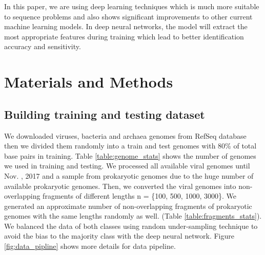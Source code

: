 \documentclass[conference]{IEEEtran}
\begin{document}

In this paper, we are using deep learning techniques which is much more suitable to sequence problems and also shows significant improvements to other current machine learning models. In deep neural networks, the model will extract the most appropriate features during training which lead to better identification accuracy and sensitivity. 

\section{Materials and Methods}

\subsection{Building training and testing dataset}
We downloaded viruses, bacteria and archaea genomes from RefSeq database then we divided them randomly into a train and test genomes with 80\% of total base pairs in training. Table \ref{table:genome_stats} shows the number of genomes we used in training and testing. We processed all available viral genomes until Nov. , 2017 and a sample from prokaryotic genomes due to the huge number of available prokaryotic genomes. Then, we converted the viral genomes into non-overlapping fragments of different lengths n = \{100, 500, 1000, 3000\}. We generated an approximate number of non-overlapping fragments of prokaryotic genomes with the same lengths randomly as well. (Table \ref{table:fragments_stats}). We balanced the data of both classes using random under-sampling technique to avoid the bias to the majority class with the deep neural network. Figure \ref{fig:data_pipline} shows more details for data pipeline.
\end{document}
